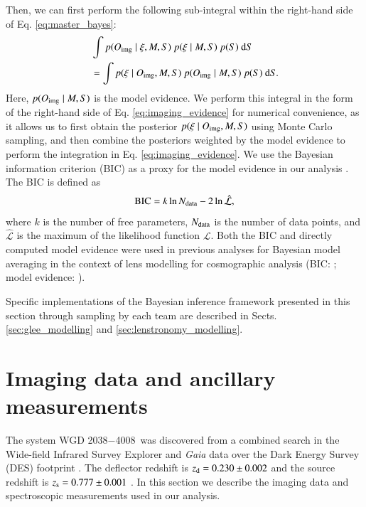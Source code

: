 \documentclass[longauth]{aa}
\newcommand{\lensname}{WGD 2038$-$4008}
\newcommand{\rmd}{{\rm d}}
\newcommand{\ajs}[1]{{{#1}}}
\begin{document}
%
Then, we can first perform the following sub-integral within the right-hand side of Eq. \ref{eq:master_bayes}:
%
\begin{equation} \label{eq:imaging_evidence}
\begin{split}
        &\int p(O_{\rm img} \mid \xi, M, S)\ p(\xi \mid M, S)\ p(S)\ \rmd S \\ 
        & = \int p(\xi \mid O_{\rm img}, M, S) \ p(O_{\rm img} \mid M, S) \ p(S) \ \rmd S.
\end{split}
\end{equation}
%
Here, $p(O_{\rm img} \mid M, S)$ is the model evidence. We perform this integral in the form of the right-hand side of Eq. \ref{eq:imaging_evidence} for numerical convenience, as it allows us to first obtain the posterior $p(\xi \mid O_{\rm img}, M, S)$ using Monte Carlo sampling, and then combine the posteriors weighted by the model evidence to perform the integration in Eq. \ref{eq:imaging_evidence}. We use the Bayesian information criterion (BIC) as a proxy for the model evidence in our analysis \citep{Schwarz78}. The BIC is defined as
%
\begin{equation} \label{eq:bic_definition}
        \mathrm{BIC} = k \ln N_{\rm data} - 2 \ln \hat{\mathcal{L}},
\end{equation}
% 
where $k$ is the number of free parameters, $N_{\rm data}$ is the number of data points, and $\hat{\mathcal{L}}$ is the \ajs{maximum} of the likelihood function $\mathcal{L}$. Both the BIC and directly computed model evidence were used in previous analyses for Bayesian model averaging \citep[BMA; e.g.][]{Madigan94, Hoeting99} in the context of lens modelling for cosmographic analysis (BIC: \citealt{Birrer19b, Chen19, Rusu20}; model evidence: \citealt{Shajib20}).

Specific implementations of the Bayesian inference framework presented in this section through sampling by each team are described in Sects. \ref{sec:glee_modelling} and \ref{sec:lenstronomy_modelling}.

\section{Imaging data and ancillary measurements} \label{sec:data}

The system \lensname\ was discovered from a combined search in the {Wide-field Infrared Survey Explorer} and \textit{Gaia} data over the Dark Energy Survey (DES) footprint \citep{Agnello18c}. The deflector redshift is $z_{\rm d} = 0.230 \pm 0.002$ and the source redshift is $z_{\rm s} = 0.777 \pm 0.001$ \citep{Agnello18c}. In this section we describe the imaging data and spectroscopic measurements used in our analysis.
 
\end{document}
